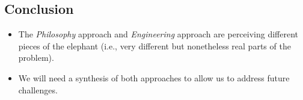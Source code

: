 \documentclass{article}
\begin{document}
\begin{multicols}{2}
\subsection*{Conclusion}
\begin{itemize}
    \item The \textit{Philosophy} approach and \textit{Engineering} approach are perceiving different pieces of the elephant (i.e., very different but nonetheless real parts of the problem).
    \item  We will need a synthesis of both approaches to allow us to address future challenges.
\end{itemize}

\end{multicols}
\end{document}
